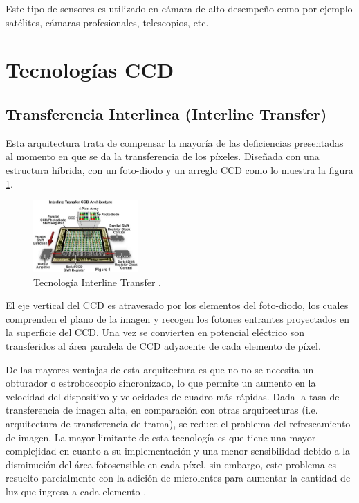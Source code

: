 \documentclass[conference]{IEEEtran}
\begin{document}
Este tipo de sensores es utilizado en cámara de alto desempe\~no como por ejemplo satélites, cámaras profesionales, telescopios, etc.

\section{\textbf{Tecnologías CCD}}
 
\subsection{\textbf{Transferencia Interlinea (Interline Transfer)}}

Esta arquitectura trata de compensar la mayoría de las deficiencias presentadas al momento en que se da la transferencia de los píxeles. Dise\~nada con una estructura híbrida, con un foto-diodo y un arreglo CCD como lo muestra la figura \ref{il_ccd}. 

\begin{figure}[H]
\centering
\includegraphics[width=4cm]{interlineccd}
\caption{Tecnología Interline Transfer \cite{IL_CCD1}.}
\label{il_ccd}
\end{figure}

El eje vertical del CCD es atravesado por los elementos del foto-diodo, los cuales comprenden el plano de la imagen y recogen los fotones entrantes proyectados en la superficie del CCD. Una vez se convierten en potencial eléctrico son transferidos al área paralela de CCD adyacente de cada elemento de píxel.

De las mayores ventajas de esta arquitectura es que no no se necesita un obturador o estroboscopio sincronizado, lo que permite un aumento en la velocidad del dispositivo y velocidades de cuadro más rápidas. Dada la tasa de transferencia de imagen alta, en comparación con otras arquitecturas  (i.e. arquitectura de transferencia de trama), se reduce el problema del refrescamiento de imagen. La mayor limitante de esta tecnología es que tiene una mayor complejidad en cuanto a su implementación y una menor sensibilidad debido a la disminución del área fotosensible en cada píxel, sin embargo, este problema es resuelto parcialmente con la adición de microlentes para aumentar la cantidad de luz que ingresa a cada elemento \cite{IL_CCD1}.
\end{document}

